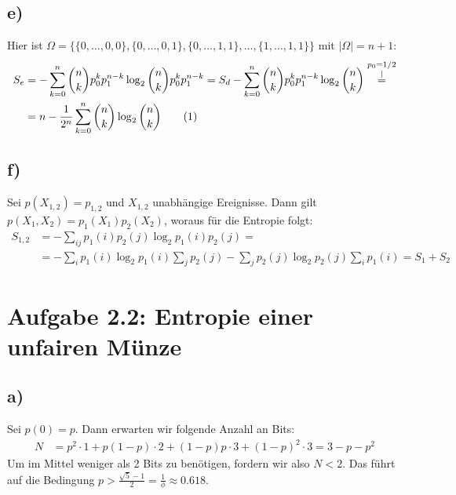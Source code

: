 \documentclass[a4paper,12pt]{article}
\newcommand\numberthis{\addtocounter{equation}{1}\tag{\theequation}}
\newcommand{\kom}{}
\begin{document}
\subsection*{e)}Hier ist $\Omega=\{\{0,\dots,0,0\},\{0,\dots,0,1\},\{0,\dots,1,1\},\dots,\{1,\dots,1,1\}\}$ mit $|\Omega|=n+1$:
\begin{align*}
S_e&=-\sum_{k=0}^n\binom{n}{k}p_0^kp_1^{n-k}\log_2\binom{n}{k}p_0^kp_1^{n-k}=S_d-\sum_{k=0}^n\binom{n}{k}p_0^kp_1^{n-k}\log_2\binom{n}{k}\kom\overset{\substack{{p_0=1/2} \\ |}}{=}\\
&=n-\frac{1}{2^n}\sum_{k=0}^n\binom{n}{k}\log_2\binom{n}{k}\numberthis\label{S aus e}
\end{align*}
\subsection*{f)}
Sei $p(X_{1,2})=p_{1,2}$ und $X_{1,2}$ unabhängige Ereignisse. Dann gilt $p(X_1,X_2)=p_1(X_1)p_2(X_2)$, woraus für die Entropie folgt:
\begin{align*}
S_{1,2}&=-\sum_{ij}p_1(i)p_2(j)\log_2p_1(i)p_2(j)=\\
&=-\sum_ip_1(i)\log_2p_1(i)\sum_jp_2(j)-\sum_jp_2(j)\log_2p_2(j)\sum_ip_1(i)=S_1+S_2
\end{align*}
\section*{Aufgabe 2.2: Entropie einer unfairen Münze}
\subsection*{a)}Sei $p(0)=p$. Dann erwarten wir folgende Anzahl an Bits:
\begin{align*}
N&=p^2\cdot 1+p(1-p)\cdot 2+(1-p)p\cdot 3+(1-p)^2\cdot 3=3-p-p^2
\end{align*}
Um im Mittel weniger als 2 Bits zu benötigen, fordern wir also $N<2$. Das führt auf die Bedingung $p>\frac{\sqrt{5}-1}{2}=\frac{1}{\phi}\approx0.618$.
\end{document}
